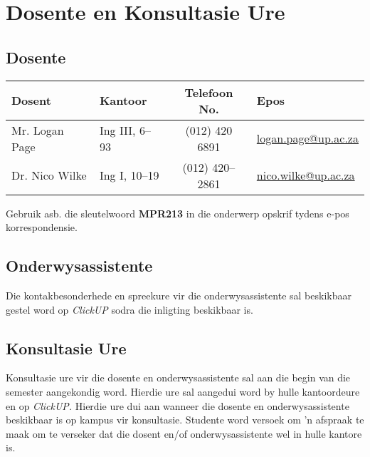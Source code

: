 \section{Dosente en Konsultasie Ure}
    \subsection{Dosente}
        \begin{table}[!h]
            \begin{center}
             \begin{tabular}{|l|l|c|l|}
                 \hline
                 {\bf Dosent} & {\bf Kantoor} & {\bf Telefoon No.} & {\bf Epos} \\
                 \hline
                 Mr. Logan Page &
                 Ing III, 6--93 &
                 (012) 420 6891 &
                 \href{mailto:logan.page@up.ac.za}{logan.page@up.ac.za} \\
                 Dr. Nico Wilke &
                 Ing I, 10--19 &
                 (012) 420--2861 &
                 \href{mailto:nico.wilke@up.ac.za}{nico.wilke@up.ac.za} \\
                 \hline
             \end{tabular}
            \end{center}
        \end{table}

      Gebruik asb. die sleutelwoord \textbf{MPR213} in die onderwerp
      opskrif tydens e-pos korrespondensie.
    
    \subsection{Onderwysassistente}
	Die kontakbesonderhede en spreekure vir die onderwysassistente sal
	beskikbaar gestel word op \textit{ClickUP} sodra die inligting beskikbaar is.
    
    \subsection{Konsultasie Ure}
        Konsultasie ure vir die dosente en onderwysassistente sal aan die begin 
        van die semester aangekondig word.  Hierdie ure sal aangedui word by 
        hulle kantoordeure en op \textit{ClickUP.}  Hierdie ure dui aan wanneer die 
        dosente en onderwysassistente beskikbaar is op kampus vir konsultasie.
        Studente word versoek om 'n afspraak te maak om te verseker dat die 
        dosent en/of onderwysassistente wel in hulle kantore is.
        
